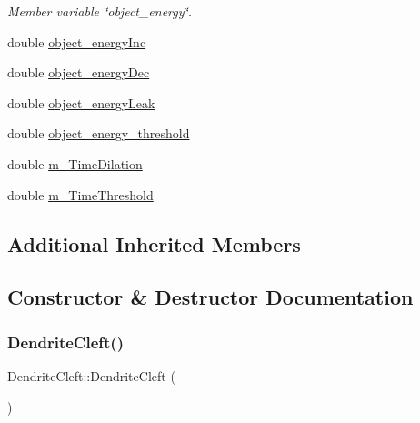 \begin{DoxyCompactItemize}
\begin{DoxyCompactList}\small\item\em Member variable \char`\"{}object\+\_\+energy\char`\"{}. \end{DoxyCompactList}\item 
double \mbox{\hyperlink{classDendriteCleft_a81149b707c189d2b96a40af75af1f059}{object\+\_\+energy\+Inc}}
\item 
double \mbox{\hyperlink{classDendriteCleft_aba50e581f1aec412b7b44ecd0dfc8076}{object\+\_\+energy\+Dec}}
\item 
double \mbox{\hyperlink{classDendriteCleft_a541502a9ffbc2926e76d2eb4a972ae39}{object\+\_\+energy\+Leak}}
\item 
double \mbox{\hyperlink{classDendriteCleft_ac73d775c34a5c3f186b395c8e7738cd8}{object\+\_\+energy\+\_\+threshold}}
\item 
double \mbox{\hyperlink{classDendriteCleft_a8236dc02dccfe1f59bb0d288599a84b5}{m\+\_\+\+Time\+Dilation}}
\item 
double \mbox{\hyperlink{classDendriteCleft_a504e4aef51d3e52dbad3589844a821de}{m\+\_\+\+Time\+Threshold}}
\end{DoxyCompactItemize}
\subsection*{Additional Inherited Members}


\subsection{Constructor \& Destructor Documentation}
\mbox{\label{classDendriteCleft_a244a2e6377fafdf79df757d39a2684e5}} 
\subsubsection{\texorpdfstring{Dendrite\+Cleft()}{DendriteCleft()}\hspace{0.1cm}{\footnotesize\ttfamily [1/4]}}
{\footnotesize\ttfamily Dendrite\+Cleft\+::\+Dendrite\+Cleft (\begin{DoxyParamCaption}{ }\end{DoxyParamCaption})\hspace{0.3cm}{\ttfamily [inline]}}

\mbox{\label{classDendriteCleft_a335660dfc63f55980b2dcf8849568086}} 

